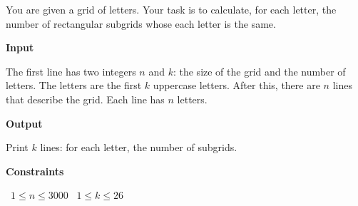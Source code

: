 You are given a grid of letters. Your task is to calculate, for each letter, the number of rectangular subgrids whose each letter is the same.

\vspace{0.3cm}\noindent\textbf{Input}

The first line has two integers $n$ and $k$: the size of the grid and the number of letters. The letters are the first $k$ uppercase letters.
After this, there are $n$ lines that describe the grid. Each line has $n$ letters.

\vspace{0.3cm}\noindent\textbf{Output}

Print $k$ lines: for each letter, the number of subgrids.

\vspace{0.3cm}\noindent\textbf{Constraints}

\textbullet\ $1 \le n \le 3000$
\textbullet\ $1 \le k \le 26$